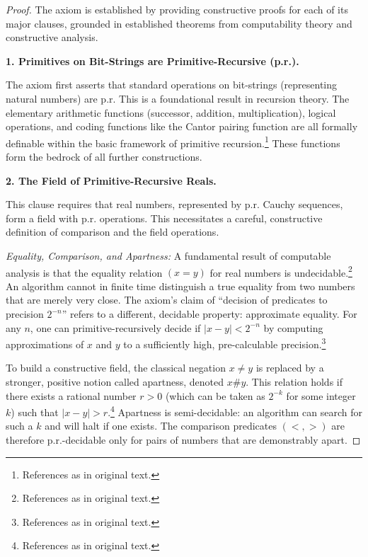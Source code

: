 \documentclass[12pt, a4paper]{article}
\begin{document}
\begin{proof}
The axiom is established by providing constructive proofs for each of its major clauses, grounded in established theorems from computability theory and constructive analysis.

\medskip
\noindent \textbf{1. Primitives on Bit-Strings are Primitive-Recursive (p.r.).}

The axiom first asserts that standard operations on bit-strings (representing natural numbers) are p.r. This is a foundational result in recursion theory. The elementary arithmetic functions (successor, addition, multiplication), logical operations, and coding functions like the Cantor pairing function are all formally definable within the basic framework of primitive recursion.\footnote{References as in original text.} These functions form the bedrock of all further constructions.

\medskip
\noindent \textbf{2. The Field of Primitive-Recursive Reals.}

This clause requires that real numbers, represented by p.r. Cauchy sequences, form a field with p.r. operations. This necessitates a careful, constructive definition of comparison and the field operations.

\medskip
\noindent \textit{Equality, Comparison, and Apartness:} A fundamental result of computable analysis is that the equality relation \((x = y)\) for real numbers is undecidable.\footnote{References as in original text.} An algorithm cannot in finite time distinguish a true equality from two numbers that are merely very close. The axiom's claim of ``decision of predicates to precision \(2^{-n}\)'' refers to a different, decidable property: approximate equality. For any \( n \), one can primitive-recursively decide if \(\lvert x - y \rvert < 2^{-n}\) by computing approximations of \( x \) and \( y \) to a sufficiently high, pre-calculable precision.\footnote{References as in original text.}

To build a constructive field, the classical negation \( x \neq y \) is replaced by a stronger, positive notion called apartness, denoted \( x \# y \). This relation holds if there exists a rational number \( r > 0 \) (which can be taken as \( 2^{-k} \) for some integer \( k \)) such that \(\lvert x - y \rvert > r\).\footnote{References as in original text.} Apartness is semi-decidable: an algorithm can search for such a \( k \) and will halt if one exists. The comparison predicates \((<,>)\) are therefore p.r.-decidable only for pairs of numbers that are demonstrably apart.


\end{proof}
\end{document}
